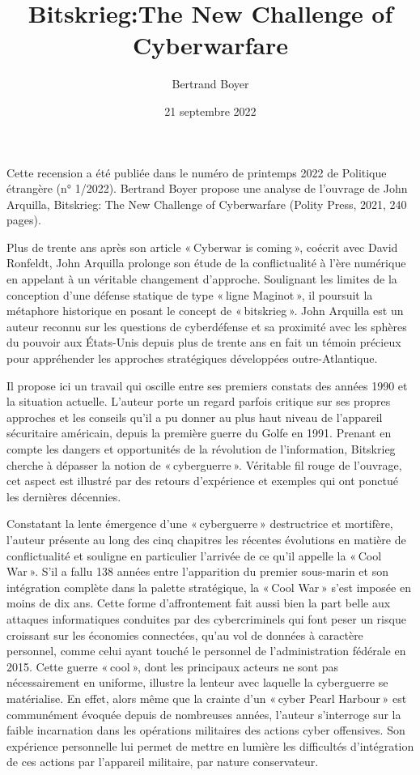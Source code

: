 \documentclass[a4paper]{article}
\title{Bitskrieg:The New Challenge of Cyberwarfare}
\author{Bertrand Boyer} %
\date{21 septembre 2022}
\begin{document}
\maketitle                 

Cette recension a été publiée dans le numéro de printemps 2022 de Politique étrangère (n° 1/2022). Bertrand Boyer propose une analyse de l’ouvrage de John Arquilla, Bitskrieg: The New Challenge of Cyberwarfare (Polity Press, 2021, 240 pages).

Plus de trente ans après son article « Cyberwar is coming », coécrit avec David Ronfeldt, John Arquilla prolonge son étude de la conflictualité à l’ère numérique en appelant à un véritable changement d’approche. Soulignant les limites de la conception d’une défense statique de type « ligne Maginot », il poursuit la métaphore historique en posant le concept de « bitskrieg ». John Arquilla est un auteur reconnu sur les questions de cyberdéfense et sa proximité avec les sphères du pouvoir aux États-Unis depuis plus de trente ans en fait un témoin précieux pour appréhender les approches stratégiques développées outre-Atlantique.

Il propose ici un travail qui oscille entre ses premiers constats des années 1990 et la situation actuelle. L’auteur porte un regard parfois critique sur ses propres approches et les conseils qu’il a pu donner au plus haut niveau de l’appareil sécuritaire américain, depuis la première guerre du Golfe en 1991. Prenant en compte les dangers et opportunités de la révolution de l’information, Bitskrieg cherche à dépasser la notion de « cyberguerre ». Véritable fil rouge de l’ouvrage, cet aspect est illustré par des retours d’expérience et exemples qui ont ponctué les dernières décennies.

Constatant la lente émergence d’une « cyberguerre » destructrice et mortifère, l’auteur présente au long des cinq chapitres les récentes évolutions en matière de conflictualité et souligne en particulier l’arrivée de ce qu’il appelle la « Cool War ». S’il a fallu 138 années entre l’apparition du premier sous-marin et son intégration complète dans la palette stratégique, la « Cool War » s’est imposée en moins de dix ans. Cette forme d’affrontement fait aussi bien la part belle aux attaques informatiques conduites par des cybercriminels qui font peser un risque croissant sur les économies connectées, qu’au vol de données à caractère personnel, comme celui ayant touché le personnel de l’administration fédérale en 2015. Cette guerre « cool », dont les principaux acteurs ne sont pas nécessairement en uniforme, illustre la lenteur avec laquelle la cyberguerre se matérialise. En effet, alors même que la crainte d’un « cyber Pearl Harbour » est communément évoquée depuis de nombreuses années, l’auteur s’interroge sur la faible incarnation dans les opérations militaires des actions cyber offensives. Son expérience personnelle lui permet de mettre en lumière les difficultés d’intégration de ces actions par l’appareil militaire, par nature conservateur.
\end{document}

